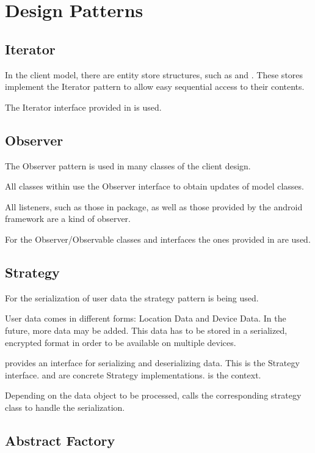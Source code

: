 \chapter{Design Patterns}

\section{Iterator}
In the client model, there are entity store structures, such as  and . These stores implement the Iterator pattern to allow easy sequential access to their contents.

The Iterator interface provided in  is used.

\section{Observer}
The Observer pattern is used in many classes of the client design. 

All classes within  use the Observer interface to obtain updates of model classes.

All listeners, such as those in  package, as well as those provided by the android framework are a kind of observer.

For the Observer/Observable classes and interfaces the ones provided in   are used.

\section{Strategy}
For the serialization of user data the strategy pattern is being used.

User data comes in different forms: Location Data and Device Data. In the future, more data may be added. This data has to be stored in a serialized, encrypted format in order to be available on multiple devices.

 provides an interface for serializing and deserializing data. This is the Strategy interface.  and  are concrete Strategy implementations.  is the context.

Depending on the data object to be processed,  calls the corresponding strategy class to handle the serialization.

\section{Abstract Factory}


